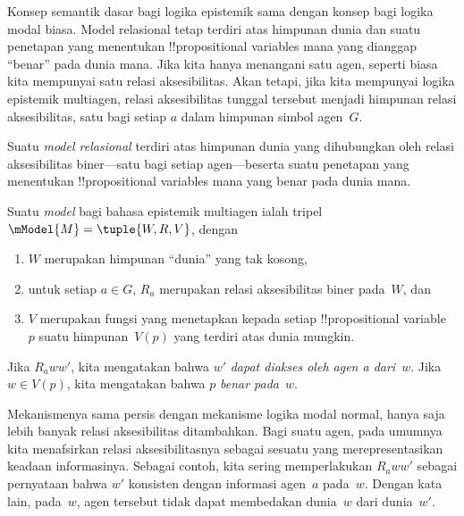\documentclass[../../../include/open-logic-section]{subfiles}
\begin{document}


Konsep semantik dasar bagi logika epistemik sama dengan konsep bagi logika
modal biasa. Model relasional tetap terdiri atas himpunan dunia dan suatu
penetapan yang menentukan !!{propositional variable}s mana yang dianggap
``benar'' pada dunia mana. Jika kita hanya menangani satu agen, seperti biasa
kita mempunyai satu relasi aksesibilitas. Akan tetapi, jika kita mempunyai
logika epistemik multiagen, relasi aksesibilitas tunggal tersebut menjadi
himpunan relasi aksesibilitas, satu bagi setiap $a$ dalam himpunan simbol
agen~$G$.

Suatu \emph{model relasional} terdiri atas himpunan dunia yang dihubungkan
oleh relasi aksesibilitas biner---satu bagi setiap agen---beserta suatu
penetapan yang menentukan !!{propositional variable}s mana yang benar pada
dunia mana.

\begin{defn}
  Suatu \emph{model} bagi bahasa epistemik multiagen ialah tripel
  $\mModel{M}=\tuple{W,R,V}$, dengan
  \begin{enumerate}
  \item $W$ merupakan himpunan ``dunia'' yang tak kosong,
  \item untuk setiap $a\in G$, ${R}_a$ merupakan relasi aksesibilitas biner
    pada~$W$, dan
  \item $V$ merupakan fungsi yang menetapkan kepada setiap !!{propositional
    variable}~$p$ suatu himpunan~$V(p)$ yang terdiri atas dunia mungkin.
  \end{enumerate}
  Jika $R_a ww'$, kita mengatakan bahwa $w'$ \emph{dapat diakses oleh agen
    a dari}~$w$. Jika $w\in V(p)$, kita mengatakan bahwa $p$
  \emph{benar pada}~$w$.
\end{defn}

Mekanismenya sama persis dengan mekanisme logika modal normal, hanya saja
lebih banyak relasi aksesibilitas ditambahkan. Bagi suatu agen, pada umumnya
kita menafsirkan relasi aksesibilitasnya sebagai sesuatu yang
merepresentasikan keadaan informasinya. Sebagai contoh, kita sering
memperlakukan $R_a ww'$ sebagai pernyataan bahwa $w'$ konsisten dengan
informasi agen~$a$ pada~$w$. Dengan kata lain, pada~$w$, agen tersebut tidak
dapat membedakan dunia~$w$ dari dunia~$w'$.
\end{document}
